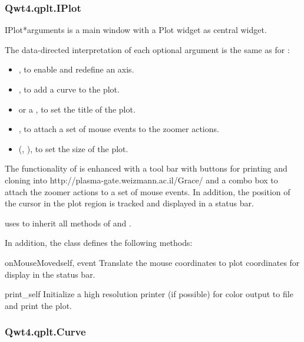 \documentclass{manual}
\newcommand{\Grace}{\ulink{Grace}
  {http://plasma-gate.weizmann.ac.il/Grace/}}
\newcommand{\Download}{\ulink{download}
  {http://pyqwt.sourceforge.net/download.html}}
\newcommand{\Future}{
  \begin{notice}[warning]
    The documentation is for the future PyQwt-4.2.2 which is only available
    from CVS. The \Download{} page has links for the latest releases.
  \end{notice}
}
\renewcommand{\Future}{}
\begin{document}
\subsubsection{Qwt4.qplt.IPlot \label{intro-qplt-iplot}}

\Future{}

\begin{classdesc}{IPlot}{*arguments}
   is a main window with a Plot widget as central widget.

  The data-directed interpretation of each optional argument is the
  same as for :
  \begin{itemize}
  \item
    , to enable and redefine an axis.
  \item
    , to add a curve to the plot.
  \item
     or a , to set the title of the plot.
  \item
    , to attach a set of mouse events to the zoomer actions.
  \item
    (, ), to set the size of the plot.
  \end{itemize}

  The functionality of  is enhanced with a tool bar with
  buttons for printing and cloning into \Grace{} and a combo box to attach
  the zoomer actions to a set of mouse events.
  In addition, the position of the cursor in the plot region is tracked
  and displayed in a status bar. 

   uses  to inherit all methods of
   and .


In addition, the class  defines the following methods:

\begin{methoddesc}[Plot]{onMouseMoved}{self, event}
Translate the mouse coordinates to plot coordinates for display in the status
bar.
\end{methoddesc}

\begin{methoddesc}[IPlot]{print_}{self}
Initialize a high resolution printer (if possible) for color output to file and
print the plot.
\end{methoddesc}

\end{classdesc}

\subsubsection{Qwt4.qplt.Curve \label{intro-qplt-curve}}
\end{document}
